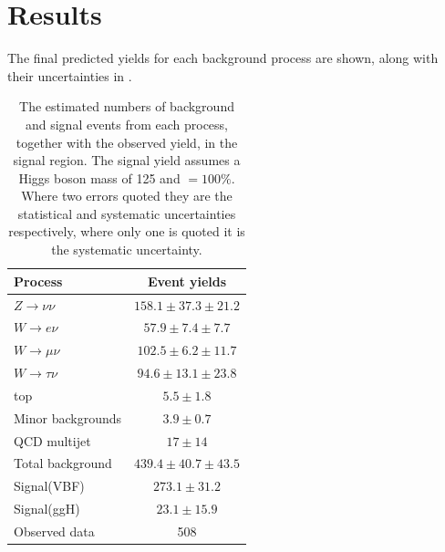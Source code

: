 
\section{Results}%
\label{sec:parkedresults}
The final predicted yields for each background process are shown, along with their uncertainties in .
\begin{table}
\caption{The estimated numbers of background and signal events from each process, together with the observed yield, in the signal region. The signal yield assumes a Higgs boson mass of 125 \GeV and \BRinv$=100\%$. Where two errors quoted they are the statistical and systematic uncertainties respectively, where only one is quoted it is the systematic uncertainty.}


\label{tab:parkedresults}
\begin{tabular}{lc}
\hline \hline
Process & Event yields \\
\hline
$Z\rightarrow\nu\nu$&$158.1 \pm 37.3 \pm 21.2$\\
$W\rightarrow e\nu$&$57.9 \pm 7.4 \pm 7.7$\\
$W\rightarrow\mu\nu$&$102.5 \pm 6.2 \pm 11.7$\\
$W\rightarrow\tau\nu$&$94.6 \pm 13.1 \pm 23.8$\\
top&$5.5 \pm  1.8$\\
Minor backgrounds&$3.9 \pm 0.7$\\
QCD multijet &$17\pm 14$\\
\hline
Total background &$439.4 \pm 40.7 \pm 43.5 $\\
\hline
Signal(VBF) &$273.1 \pm 31.2 $\\
Signal(ggH) &$23.1 \pm 15.9 $\\
\hline
Observed data & 508 \\
\hline \hline
\end{tabular}
\end{table}

